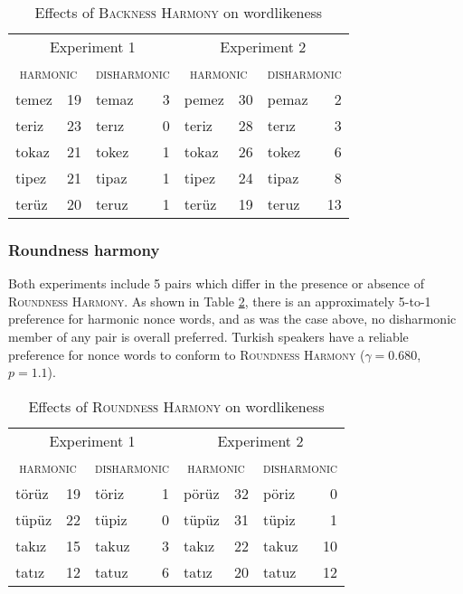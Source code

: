 \begin{table}[ht]
\centering
\begin{tabular}{lrlr|lrlr}
\toprule
\multicolumn{4}{c|}{Experiment 1} & \multicolumn{4}{c}{Experiment 2} \\
\multicolumn{2}{c}{\textsc{harmonic}} & \multicolumn{2}{c|}{\textsc{disharmonic}} & \multicolumn{2}{c}{\textsc{harmonic}} & \multicolumn{2}{c}{\textsc{disharmonic}} \\
\midrule
{temez} & 19            & {temaz} & 3 & {pemez} & 30            & {pemaz} & 2 \\
{teriz} & 23            & {terız} & 0 & {teriz} & 28            & {terız} & 3 \\
{tokaz} & 21            & {tokez} & 1 & {tokaz} & 26            & {tokez} & 6 \\
{tipez} & 21            & {tipaz} & 1 & {tipez} & 24            & {tipaz} & 8 \\
{terüz} & 20            & {teruz} & 1 & {terüz} & 19            & {teruz} & 13 \\
\bottomrule
\end{tabular}
\caption{Effects of \textsc{Backness Harmony} on wordlikeness \citep[from][]{Zimmer1969}}
\label{bhw}
\end{table}

\subsubsection{Roundness harmony}

Both experiments include 5 pairs which differ in the presence or absence of \textsc{Roundness Harmony}. As shown in Table \ref{rhw}, there is an approximately 5-to-1 preference for harmonic nonce words, and as was the case above, no disharmonic member of any pair is overall preferred. Turkish speakers have a reliable preference for nonce words to conform to \textsc{Roundness Harmony} ($\gamma = 0.680$, $p = 1.1$).

\begin{table}[ht]
\center
\begin{tabular}{lrlr|lrlr}
\toprule
\multicolumn{4}{c|}{Experiment 1} & \multicolumn{4}{c}{Experiment 2} \\
\multicolumn{2}{c}{\textsc{harmonic}} & \multicolumn{2}{c|}{\textsc{disharmonic}} & \multicolumn{2}{c}{\textsc{harmonic}} & \multicolumn{2}{c}{\textsc{disharmonic}} \\
\midrule
{törüz} & 19 & {töriz} & 1 & {pörüz} & 32 & {pöriz} & 0  \\
{tüpüz} & 22 & {tüpiz} & 0 & {tüpüz} & 31 & {tüpiz} & 1  \\
{takız} & 15 & {takuz} & 3 & {takız} & 22 & {takuz} & 10 \\
{tatız} & 12 & {tatuz} & 6 & {tatız} & 20 & {tatuz} & 12 \\
\bottomrule
\end{tabular}
\caption{Effects of \textsc{Roundness Harmony} on wordlikeness \citep[from][]{Zimmer1969}}
\label{rhw}
\end{table}

